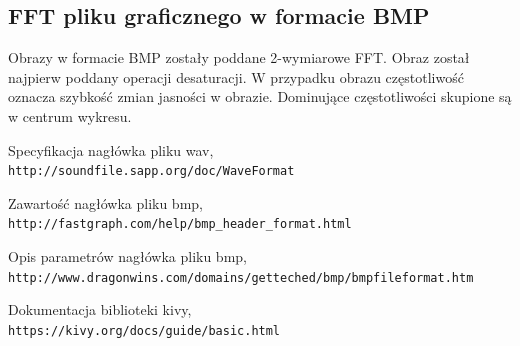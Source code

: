 \documentclass{article}
\begin{document}
\subsection{FFT pliku graficznego w formacie BMP}
Obrazy w formacie BMP zostały poddane 2-wymiarowe FFT. Obraz został najpierw poddany operacji desaturacji. W przypadku obrazu częstotliwość oznacza szybkość zmian jasności w obrazie. Dominujące częstotliwości skupione są w centrum wykresu.

\newpage
\begin{thebibliography}{9}

Specyfikacja nagłówka pliku wav,
\\\texttt{http://soundfile.sapp.org/doc/WaveFormat}

Zawartość nagłówka pliku bmp,
\\\texttt{http://fastgraph.com/help/bmp\_header\_format.html}

Opis parametrów nagłówka pliku bmp,
\\\texttt{http://www.dragonwins.com/domains/getteched/bmp/bmpfileformat.htm}

Dokumentacja biblioteki kivy,
\\\texttt{https://kivy.org/docs/guide/basic.html}

\end{thebibliography}
\end{document}

